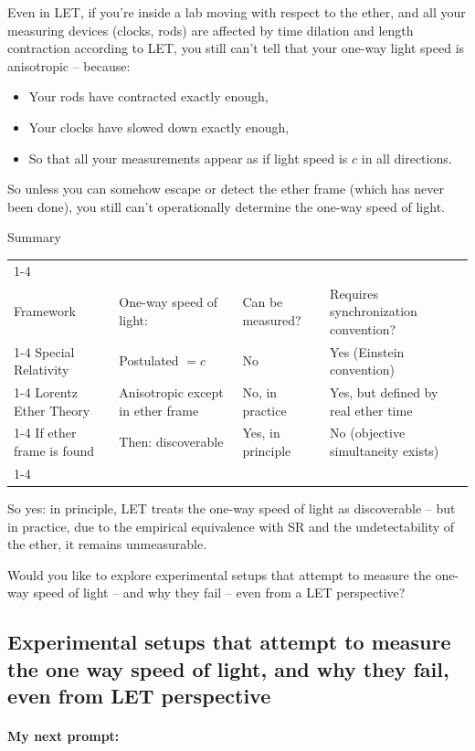 \documentclass[a4paper]{article}
\theoremstyle{plain}
\theoremstyle{definition}
\begin{document}
Even in LET, if you're inside a lab moving with respect to the ether,
and all your measuring devices (clocks, rods) are affected by time
dilation and length contraction according to LET, you still can’t tell
that your one-way light speed is anisotropic -- because:
\begin{itemize}
\item Your rods have contracted exactly enough,
\item Your clocks have slowed down exactly enough,
\item So that all your measurements appear as if light speed is $c$ in
  all directions.
\end{itemize}
So unless you can somehow escape or detect the ether frame (which has
never been done), you still can’t operationally determine the one-way
speed of light.

Summary

\begin{tabularx}{1.0\textwidth}{|p{3.4cm}|p{3.7cm}|p{2.8cm}|p{3.6cm}|}
\cline{1-4} \\
Framework & One-way speed of light: & Can be measured? & Requires synchronization convention?
\\ \cline{1-4}
Special Relativity & Postulated $= c$ & No & Yes (Einstein convention)
\\ \cline{1-4}
Lorentz Ether Theory & Anisotropic except in ether frame & No, in practice & Yes, but defined by real ether time
\\ \cline{1-4}
If ether frame is found & Then: discoverable & Yes, in principle & No (objective simultaneity exists)
\\ \cline{1-4}
\end{tabularx}
So yes: in principle, LET treats the one-way speed of light as
discoverable -- but in practice, due to the empirical equivalence with
SR and the undetectability of the ether, it remains unmeasurable.

Would you like to explore experimental setups that attempt to measure
the one-way speed of light -- and why they fail -- even from a LET
perspective?


\subsection{Experimental setups that attempt to measure the one way speed of light, and why they fail, even from LET perspective}

\paragraph{My next prompt:}
\end{document}

